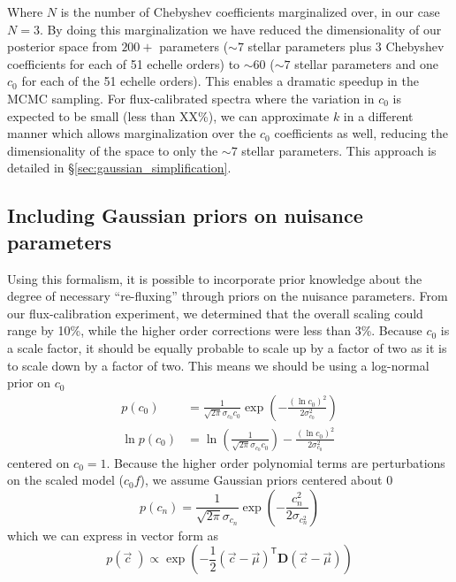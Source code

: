 \documentclass[preprint]{aastex} %
\newcommand{\vc}{\vec{c}}
\newcommand{\trans}{\mathsf{T}}
\begin{document}
Where $N$ is the number of Chebyshev coefficients marginalized over, in our case $N=3$. By doing this marginalization we have reduced the dimensionality of our posterior space from $200+$ parameters ($\sim 7$ stellar parameters plus 3 Chebyshev coefficients for each of 51 echelle orders) to $\sim 60$ ($\sim 7$ stellar parameters and one $c_0$ for each of the 51 echelle orders). This enables a dramatic speedup in the MCMC sampling. For flux-calibrated spectra where the variation in $c_0$ is expected to be small (less than XX\%), we can approximate $k$ in a different manner which allows marginalization over the $c_0$ coefficients as well, reducing the dimensionality of the space to only the $\sim 7$ stellar parameters. This approach is detailed in \S\ref{sec:gaussian_simplification}.

\subsection{Including Gaussian priors on nuisance parameters}
\label{sec:priors}
Using this formalism, it is possible to incorporate prior knowledge about the degree of necessary ``re-fluxing'' through priors on the nuisance parameters. From our flux-calibration experiment, we determined that the overall scaling could range by 10\%, while the higher order corrections were less than 3\%. Because $c_0$ is a scale factor, it should be equally probable to scale up by a factor of two as it is to scale down by a factor of two. This means we should be using a log-normal prior on $c_0$
\begin{align}
  p(c_0) &= \frac{1}{\sqrt{2 \pi} \sigma_{c_0} c_0} \exp \left( -\frac{(\ln c_0)^2}{2 \sigma_{c_0}^2} \right) \\
  \ln p(c_0) &= \ln \left( \frac{1}{\sqrt{2 \pi} \sigma_{c_0} c_0} \right) - \frac{(\ln c_0)^2}{2 \sigma_{c_0}^2}
\end{align}
centered on $c_0 = 1$. Because the higher order polynomial terms are perturbations on the scaled model ($c_0 f$), we assume Gaussian priors centered about 0
\begin{equation}
  p(c_n) = \frac{1}{\sqrt{2 \pi} \sigma_{c_n}} \exp \left( - \frac{c_n^2}{2 \sigma_{c_n^2}} \right)
\end{equation}
which we can express in vector form as
\begin{equation}
  p(\vc\;) \propto \exp \left ( -\frac{1}{2} (\vc - \vec{\mu})^\trans {\bm D} (\vc - \vec{\mu}) \right )
  \label{eqn:nuisance_prior} 
\end{equation}
\end{document}

